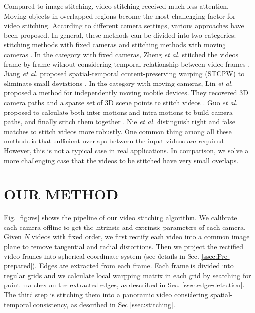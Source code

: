 \documentclass[conference]{IEEEtran}
\begin{document}
 Compared to image stitching, video stitching received much less attention. 
Moving objects in overlapped regions become the most challenging factor for video stitching.
%
According to different camera settings, various approaches have been proposed. In general, these methods can be divided into two categories: 
stitching methods with fixed cameras \cite{zheng2008stitching, he2010panoramic, Jiang_2015_CVPR_Workshops, perazzi2015panoramic, li2015efficient} 
and stitching methods with moving cameras \cite{lin2016seamless, guo2016joint, nie2018dynamic}. 
%
In the category with fixed cameras, Zheng \textit{et al.} stitched the videos frame by frame without considering temporal relationship between video frames \cite{zheng2008stitching}.
Jiang \textit{et al.} proposed spatial-temporal content-preserving warping (STCPW) to eliminate small deviations \cite{Jiang_2015_CVPR_Workshops}.
In the category with moving cameras, 
Lin \textit{et al.} proposed a method for independently moving mobile devices.
They recovered 3D camera paths and a sparse set of 3D scene points to stitch videos \cite{lin2016seamless}.
Guo \textit{et al.} proposed to calculate both inter
motions and intra motions to build camera paths, and finally stitch them together \cite{guo2016joint}.
Nie \textit{et al.} distinguish right and false matches \cite{nie2018dynamic} to stitch videos more robustly. 
One common thing among all these methods is that sufficient overlaps between the input videos are required. 
However, this is not a typical case in real applications. 
In comparison, we solve a more challenging case that the videos to be stitched have very small overlaps.

\section{OUR METHOD}
\label{sec:ourmethod}

Fig. \ref{fig:res} shows the pipeline of our video stitching algorithm.
We calibrate each camera offline to get the intrinsic and extrinsic parameters of each camera. 
Given $N$ videos with fixed order, we first rectify each video into a common image plane to remove tangential and radial distortions.
Then we project the rectified video frames into spherical coordinate system (see details in Sec. \ref{ssec:Pre-prepared}). 
Edges are extracted from each frame.
Each frame is divided into regular grids and we calculate local warpping matrix in each grid by searching for point matches on the extracted edges, as described in Sec. \ref{ssec:edge-detection}. 
The third step is stitching them into a panoramic video considering spatial-temporal consistency, as described in Sec \ref{ssec:stitching}.
\end{document}
